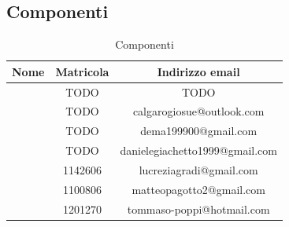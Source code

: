 \subsection{Componenti}

\renewcommand{\arraystretch}{1}
	\begin{table}[H]
		\begin{center}
			\setlength{\aboverulesep}{0pt}
			\setlength{\belowrulesep}{0pt}
			\setlength{\extrarowheight}{.75ex}
			\begin{tabular}{ c c c }
				\rowcolor{AzzurroGruppo!30} 
				\textbf{Nome} & \textbf{Matricola} & \textbf{Indirizzo email}\\
				\toprule
				
				\Davide{} & TODO & TODO \\
                \Giosue{} & TODO & calgarogiosue@outlook.com \\
                \Francesco{} & TODO & dema199900@gmail.com \\
                \Daniele{} & TODO & danielegiachetto1999@gmail.com \\
                \Lucrezia{} & 1142606 & lucreziagradi@gmail.com \\
				\Matteo{} & 1100806 & matteopagotto2@gmail.com \\
                \Tommaso{} & 1201270 & tommaso-poppi@hotmail.com \\
				
				\bottomrule
			\end{tabular}
			\caption{Componenti}
		\end{center}
    \end{table}